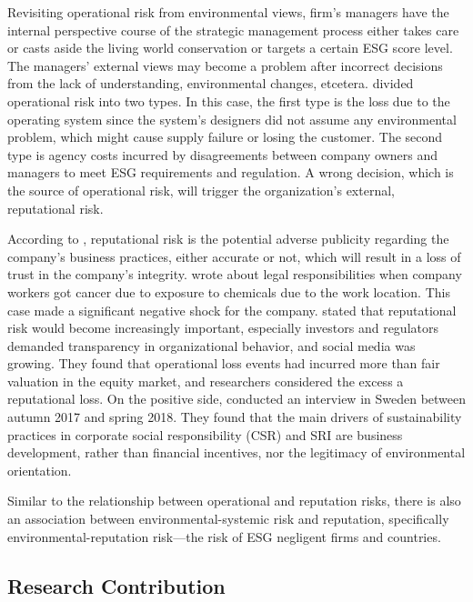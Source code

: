 \documentclass[sn-basic]{sn-jnl}%
\theoremstyle{thmstyleone}%
\theoremstyle{thmstyletwo}%
\theoremstyle{thmstylethree}%
\begin{document}
Revisiting operational risk from environmental views, firm’s managers have the internal perspective course of the strategic management process either takes care or casts aside the living world conservation or targets a certain ESG score level. The managers' external views may become a problem after incorrect decisions from the lack of understanding, environmental changes, etcetera. \citet{jarrow2008operational} divided operational risk into two types. In this case, the first type is the loss due to the operating system since the system’s designers did not assume any environmental problem, which might cause supply failure or losing the customer. The second type is agency costs incurred by disagreements between company owners and managers to meet ESG requirements and regulation. A wrong decision, which is the source of operational risk, will trigger the organization’s external, reputational risk.

According to \citet{solvency2007glossary}, reputational risk is the potential adverse publicity regarding the company’s business practices, either accurate or not, which will result in a loss of trust in the company’s integrity. \citet{gormley2011growing} wrote about legal responsibilities when company workers got cancer due to exposure to chemicals due to the work location. This case made a significant negative shock for the company. \citet{gatzert2016assessing} stated that reputational risk would become increasingly important, especially investors and regulators demanded transparency in organizational behavior, and social media was growing. They found that operational loss events had incurred more than fair valuation in the equity market, and researchers considered the excess a reputational loss. On the positive side, \cite{maltais2020understanding} conducted an interview in Sweden between autumn 2017 and spring 2018. They found that the main drivers of sustainability practices in corporate social responsibility (CSR) and SRI are business development, rather than financial incentives, nor the legitimacy of environmental orientation.

Similar to the relationship between operational and reputation risks, there is also an association between environmental-systemic risk and reputation, specifically environmental-reputation risk—the risk of ESG negligent firms and countries.

\subsection{Research Contribution}
\end{document}

